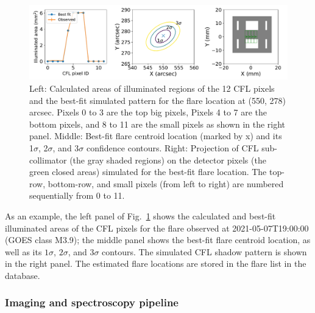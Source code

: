 \documentclass[referee]{aa} %
\begin{document}
\begin{figure}
  \centering
  \includegraphics[width=0.95\linewidth]{figures/cflMay07.pdf}
  \caption{
   Left: Calculated areas of illuminated regions of the 12 CFL pixels and the best-fit simulated pattern for the flare location at (550, 278) arcsec. Pixels 0 to 3 are the top big pixels, Pixels 4 to 7 are the bottom pixels, and 8 to 11 are the small pixels as shown in the right panel.
   Middle: Best-fit flare centroid location (marked by x) and its 1$\sigma$, 2$\sigma$, and 3$\sigma$ confidence contours. {Right: Projection of CFL sub-collimator (the gray shaded regions) on the detector pixels (the green closed areas) simulated for the best-fit flare location.  The top-row,  bottom-row, and small pixels (from left to right) are numbered sequentially from  0 to 11.  }}
  \label{fig:cfl}
\end{figure}
As an example, the left panel of Fig.~\ref{fig:cfl} shows the calculated and best-fit illuminated areas of the CFL pixels for the flare observed at 2021-05-07T19:00:00 (GOES class M3.9);  the middle panel shows the best-fit flare centroid location, as well as its $1\sigma$, $2\sigma$, and $3\sigma$ contours. 
The simulated CFL shadow pattern is shown in the right panel. 
The estimated flare locations are stored in the flare list in the database. 

\subsubsection{Imaging and spectroscopy pipeline}
\end{document}
